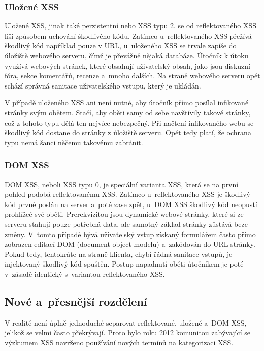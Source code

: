 \documentclass[11pt, conference, a4paper]{IEEEtran}
\begin{document}
\subsubsection{Uložené XSS}
Uložené XSS, jinak také perzistentní nebo XSS typu 2, se od reflektovaného XSS liší způsobem uchování škodlivého kódu. Zatímco u~reflektovaného XSS přežívá škodlivý kód například pouze v URL, u~uloženého XSS se trvale zapíše do úložiště webového serveru, čímž je převážně nějaká databáze. Útočník k útoku využívá webových stránek, které obsahují uživatelský obsah, jako jsou diskuzní fóra, sekce komentářů, recenze a~mnoho dalších. Na straně webového serveru opět schází správná sanitace uživatelského vstupu, který je ukládán. 

V případě uloženého XSS ani není nutné, aby útočník přímo posílal infikované stránky svým obětem. Stačí, aby oběti samy od sebe navštívily takové stránky, což z tohoto typu dělá ten nejvíce nebezpečný. Při načtení infikovaného webu se škodlivý kód dostane do stránky z úložiště serveru. Opět tedy platí, že ochrana typu  nemá šanci něčemu takovému zabránit.~\cite{XSS-owasp}

\subsubsection{DOM XSS}
DOM XSS, neboli XSS typu 0, je speciální varianta XSS, která se na první pohled podobá reflektovanému XSS. Zatímco u~reflektovaného XSS je škodlivý kód prvně poslán na server a~poté zase zpět, u~DOM XSS škodlivý kód neopustí prohlížeč své oběti. Prerekvizitou jsou dynamické webové stránky, které si ze serveru stahují pouze potřebná data, ale samotný základ stránky zůstává beze změny. V~tomto případě bývá uživatelský vstup získaný formulářem často přímo zobrazen editací DOM (document object modelu) a~zakódován do URL stránky. Pokud tedy, tentokráte na straně klienta, chybí řádná sanitace vstupů, je injektovaný škodlivý kód spuštěn. Postup napadnutí oběti útočníkem je poté v~zásadě identický s~variantou reflektovaného XSS.~\cite{DOM-XSS-owasp}

\subsection{Nové a~přesnější rozdělení}
V realitě není úplně jednoduché separovat reflektované, uložené a~DOM XSS, jelikož se velmi často překrývají. Proto bylo roku 2012 komunitou zabývající se výzkumem XSS navrženo používání nových termínů na kategorizaci XSS.
\end{document}

